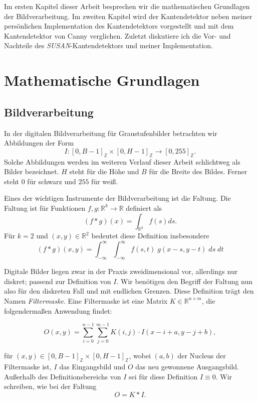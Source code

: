 \documentclass[a4paper, 11pt]{report}
\renewcommand{\emph}[1]{\textit{#1}}
\theoremstyle{definition}
\begin{document}
	Im ersten Kapitel dieser Arbeit besprechen wir die mathematischen Grundlagen der Bildverarbeitung. Im zweiten Kapitel wird der Kantendetektor neben meiner persönlichen Implementation des Kantendetektors vorgestellt und mit dem Kantendetektor von Canny verglichen. Zuletzt diskutiere ich die Vor- und Nachteile des \emph{SUSAN}-Kantendetektors und meiner Implementation.

\chapter{Mathematische Grundlagen}
	\section{Bildverarbeitung}\label{sec:imageproc}
		In der digitalen Bildverarbeitung für Graustufenbilder betrachten wir Abbildungen der Form
		$$ I: [0, B-1]_\mathbb{Z} \times [0, H-1]_\mathbb{Z} \to [0,255]_\mathbb{Z}. $$
		Solche Abbildungen werden im weiteren Verlauf dieser Arbeit schlichtweg als Bilder bezeichnet. $H$ steht für die Höhe und $B$ für die Breite des Bildes. Ferner steht $0$ für schwarz und $255$ für weiß.
		
		Eines der wichtigen Instrumente der Bildverarbeitung ist die Faltung. Die Faltung ist für Funktionen $f,g : \mathbb{R}^k \to \mathbb{R}$ definiert als
		$$ (f * g)(x) = \int_{\mathbb{R}^k} f(s) ds.$$
		Für $k = 2$ und $(x,y) \in \mathbb{R}^2$ bedeutet diese Definition insbesondere
		$$ (f*g)(x, y) = \int_{-\infty}^{\infty} \int_{-\infty}^{\infty} f(s, t) \; g(x - s, y - t) \; ds \; dt$$

		Digitale Bilder liegen zwar in der Praxis zweidimensional vor, allerdings nur diskret; passend zur Definition von $I$. Wir benötigen den Begriff der Faltung nun also für den diskreten Fall und mit endlichen Grenzen. Diese Definition trägt den Namen \emph{Filtermaske}.
		Eine Filtermaske ist eine Matrix $K \in \mathbb{R}^{n \times m}$, die folgendermaßen Anwendung findet:
		
		$$ O(x,y) = \sum_{i=0}^{n-1} \sum_{j=0}^{m-1} K(i,j) \cdot I(x-i+a, y-j+b),$$
		
		für $(x,y) \in [0, B-1]_\mathbb{Z} \times [0, H-1]_\mathbb{Z}$, wobei $(a,b)$ der Nucleus der Filtermaske ist, $I$ das Eingangsbild und $O$ das neu gewonnene Ausgangsbild. Außerhalb des Definitionsbereichs von $I$ sei für diese Definition $I \equiv 0$.
		Wir schreiben, wie bei der Faltung
		$$ O = K * I.$$
\end{document}
